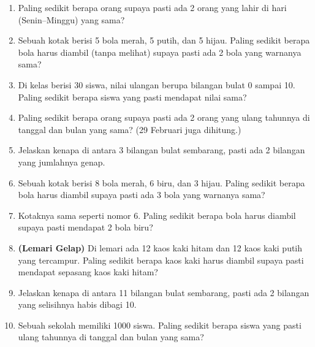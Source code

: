 \documentclass[11pt,a4paper]{article}
\begin{document}
\begin{enumerate}
  \item Paling sedikit berapa orang supaya pasti ada 2 orang yang lahir di hari (Senin--Minggu)
        yang sama?
  \item Sebuah kotak berisi 5 bola merah, 5 putih, dan 5 hijau. Paling sedikit berapa bola harus
        diambil (tanpa melihat) supaya pasti ada 2 bola yang warnanya sama?
  \item Di kelas berisi 30 siswa, nilai ulangan berupa bilangan bulat 0 sampai 10. Paling sedikit
        berapa siswa yang pasti mendapat nilai sama?
  \item Paling sedikit berapa orang supaya pasti ada 2 orang yang ulang tahunnya di tanggal dan
        bulan yang sama? (29 Februari juga dihitung.)
  \item Jelaskan kenapa di antara 3 bilangan bulat sembarang, pasti ada 2 bilangan yang
        jumlahnya genap.
\end{enumerate}

\begin{enumerate}
  \setcounter{enumi}{5}
  \item Sebuah kotak berisi 8 bola merah, 6 biru, dan 3 hijau. Paling sedikit berapa bola harus
        diambil supaya pasti ada 3 bola yang warnanya sama?
  \item Kotaknya sama seperti nomor 6. Paling sedikit berapa bola harus diambil supaya pasti
        mendapat 2 bola biru?
  \item \textbf{(Lemari Gelap)} Di lemari ada 12 kaos kaki hitam dan 12 kaos kaki putih yang
        tercampur. Paling sedikit berapa kaos kaki harus diambil supaya pasti mendapat sepasang
        kaos kaki hitam?
  \item Jelaskan kenapa di antara 11 bilangan bulat sembarang, pasti ada 2 bilangan yang
        selisihnya habis dibagi 10.
  \item Sebuah sekolah memiliki 1000 siswa. Paling sedikit berapa siswa yang pasti ulang
        tahunnya di tanggal dan bulan yang sama?
\end{enumerate}
\end{document}
